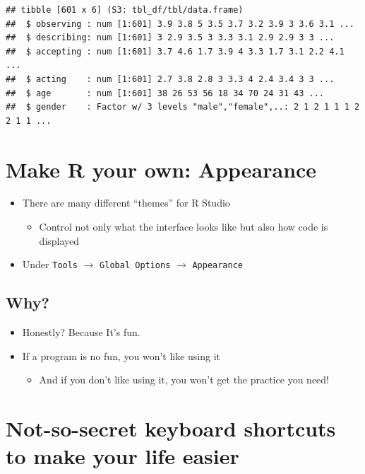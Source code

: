 \documentclass[
]{book}
\providecommand{\tightlist}{%
  \setlength{\itemsep}{0pt}\setlength{\parskip}{0pt}}
\begin{document}
\begin{verbatim}
## tibble [601 x 6] (S3: tbl_df/tbl/data.frame)
##  $ observing : num [1:601] 3.9 3.8 5 3.5 3.7 3.2 3.9 3 3.6 3.1 ...
##  $ describing: num [1:601] 3 2.9 3.5 3 3.3 3.1 2.9 2.9 3 3 ...
##  $ accepting : num [1:601] 3.7 4.6 1.7 3.9 4 3.3 1.7 3.1 2.2 4.1 ...
##  $ acting    : num [1:601] 2.7 3.8 2.8 3 3.3 4 2.4 3.4 3 3 ...
##  $ age       : num [1:601] 38 26 53 56 18 34 70 24 31 43 ...
##  $ gender    : Factor w/ 3 levels "male","female",..: 2 1 2 1 1 1 2 2 1 1 ...
\end{verbatim}

\section{Make R your own: Appearance}\label{make-r-your-own-appearance}

\begin{itemize}
\tightlist
\item
  There are many different ``themes'' for R Studio

  \begin{itemize}
  \tightlist
  \item
    Control not only what the interface looks like but also how code is displayed
  \end{itemize}
\item
  Under \texttt{Tools} \(\rightarrow\) \texttt{Global\ Options} \(\rightarrow\) \texttt{Appearance}
\end{itemize}

\subsection{Why?}\label{why}

\begin{itemize}
\tightlist
\item
  Honestly? Because It's fun.
\item
  If a program is no fun, you won't like using it

  \begin{itemize}
  \tightlist
  \item
    And if you don't like using it, you won't get the practice you need!
  \end{itemize}
\end{itemize}

\section{Not-so-secret keyboard shortcuts to make your life easier}\label{not-so-secret-keyboard-shortcuts-to-make-your-life-easier}
\end{document}

